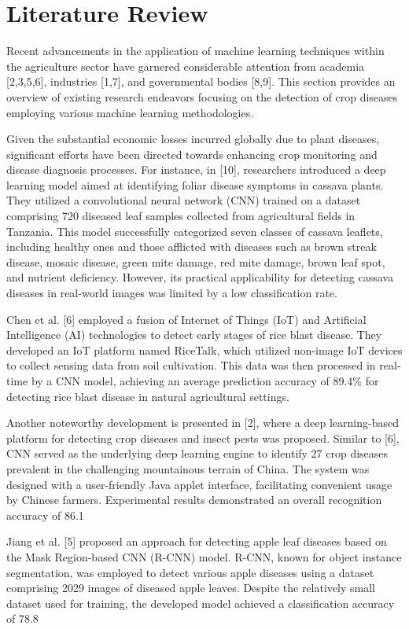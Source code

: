 \documentclass{article}
\begin{document}
\section{Literature Review}
Recent advancements in the application of machine learning techniques within the agriculture sector have garnered considerable attention from academia [2,3,5,6], industries [1,7], and governmental bodies [8,9]. This section provides an overview of existing research endeavors focusing on the detection of crop diseases employing various machine learning methodologies.

Given the substantial economic losses incurred globally due to plant diseases, significant efforts have been directed towards enhancing crop monitoring and disease diagnosis processes. For instance, in [10], researchers introduced a deep learning model aimed at identifying foliar disease symptoms in cassava plants. They utilized a convolutional neural network (CNN) trained on a dataset comprising 720 diseased leaf samples collected from agricultural fields in Tanzania. This model successfully categorized seven classes of cassava leaflets, including healthy ones and those afflicted with diseases such as brown streak disease, mosaic disease, green mite damage, red mite damage, brown leaf spot, and nutrient deficiency. However, its practical applicability for detecting cassava diseases in real-world images was limited by a low classification rate.

Chen et al. [6] employed a fusion of Internet of Things (IoT) and Artificial Intelligence (AI) technologies to detect early stages of rice blast disease. They developed an IoT platform named RiceTalk, which utilized non-image IoT devices to collect sensing data from soil cultivation. This data was then processed in real-time by a CNN model, achieving an average prediction accuracy of 89.4\% for detecting rice blast disease in natural agricultural settings.

Another noteworthy development is presented in [2], where a deep learning-based platform for detecting crop diseases and insect pests was proposed. Similar to [6], CNN served as the underlying deep learning engine to identify 27 crop diseases prevalent in the challenging mountainous terrain of China. The system was designed with a user-friendly Java applet interface, facilitating convenient usage by Chinese farmers. Experimental results demonstrated an overall recognition accuracy of 86.1%

Jiang et al. [5] proposed an approach for detecting apple leaf diseases based on the Mask Region-based CNN (R-CNN) model. R-CNN, known for object instance segmentation, was employed to detect various apple diseases using a dataset comprising 2029 images of diseased apple leaves. Despite the relatively small dataset used for training, the developed model achieved a classification accuracy of 78.8%
\end{document}
